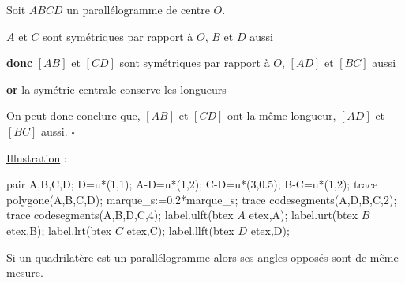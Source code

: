 \begin{changemargin}{0mm}{-15mm}
\begin{preuve}
        \begin{minipage}{0.65\linewidth}
            Soit $ABCD$ un parallélogramme de centre $O$.
            \par
            $A$ et $C$ sont symétriques par rapport à $O$, $B$ et $D$ aussi
            \par \textbf{donc} $[AB]$ et $[CD]$ sont symétriques par rapport à $O$, $[AD]$ et $[BC]$ aussi
            \par \textbf{or} la symétrie centrale conserve les longueurs
            \par On peut donc conclure que, $[AB]$ et $[CD]$ ont la même longueur, $[AD]$ et $[BC]$ aussi. $\square$
        \end{minipage}
        \begin{minipage}{0.35\linewidth}
            \begin{center}
                \underline{Illustration} :\par 
                \begin{Geometrie}[CoinHD={(7u,6u)}]
                    pair A,B,C,D;
                    D=u*(1,1);
                    A-D=u*(1,2);
                    C-D=u*(3,0.5);
                    B-C=u*(1,2);  
                    trace polygone(A,B,C,D);
                    marque_s:=0.2*marque_s;
                    trace codesegments(A,D,B,C,2);
                    trace codesegments(A,B,D,C,4);
                    label.ulft(btex $A$ etex,A);
                    label.urt(btex $B$ etex,B);
                    label.lrt(btex $C$ etex,C);
                    label.llft(btex $D$ etex,D);
                \end{Geometrie} 
            \end{center}
        \end{minipage}
    \end{preuve}
    \begin{propriete}
        Si un quadrilatère est un parallélogramme alors ses angles opposés sont de même mesure.
    \end{propriete}
    \begin{preuve}
        \phantom{rrr}


\end{preuve}
\end{changemargin}
